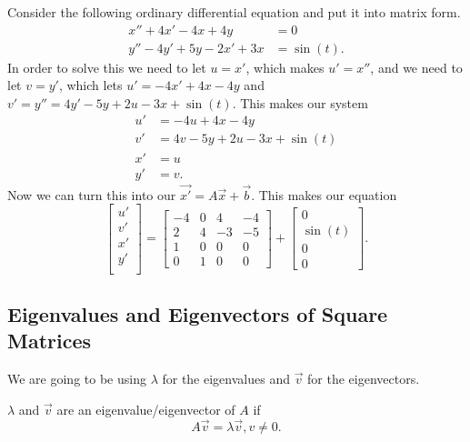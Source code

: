 \begin{eg}
  Consider the following ordinary differential equation and put it into matrix form.
  \begin{align*}
    x''+4x'-4x+4y&=0\\
    y''-4y'+5y-2x'+3x&=\sin(t)
  .\end{align*}
  In order to solve this we need to let $u=x'$, which makes $u'=x''$, and we need to let $v=y'$, which lets $u'=-4x'+4x-4y$ and $v'=y''=4y'-5y+2u-3x+\sin(t)$. This makes our system 
  \begin{align*}
    u'&=-4u+4x-4y\\
    v'&=4v-5y+2u-3x+\sin(t)\\
    x'&=u\\
    y'&=v
  .\end{align*}
  Now we can turn this into our $\vec{x'}=A\vec{x}+\vec{b}$. This makes our equation \[
    \begin{bmatrix} u'\\v'\\x'\\y'\\ \end{bmatrix} =\begin{bmatrix} -4&0&4&-4\\2&4&-3&-5\\1&0&0&0\\0&1&0&0 \end{bmatrix} +\begin{bmatrix} 0\\ \sin(t)\\0\\0 \end{bmatrix} 
  .\] 
\end{eg}

\subsection{Eigenvalues and Eigenvectors of Square Matrices}
We are going to be using $\lambda$ for the eigenvalues and $\vec{v}$ for the eigenvectors.
\begin{definition}
  $\lambda$ and $\vec{v}$ are an eigenvalue/eigenvector of $A$ if \[
  A\vec{v}=\lambda\vec{v}, v\neq 0
  .\] 
\end{definition}

